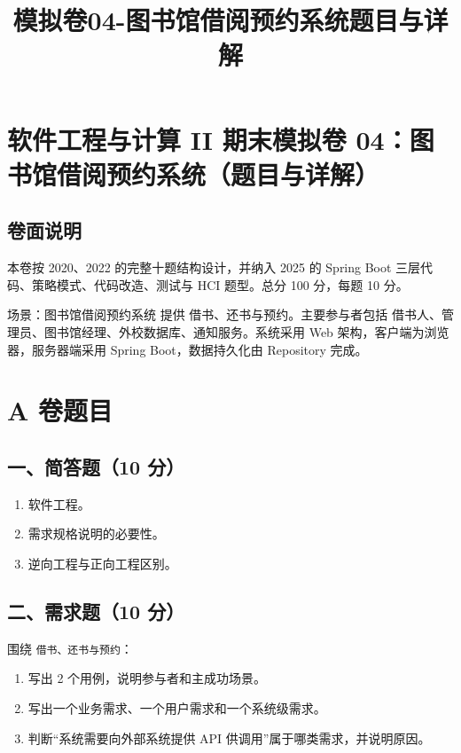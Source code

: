 \documentclass[UTF8,zihao=-4]{ctexart}
\title{模拟卷04-图书馆借阅预约系统题目与详解}
\author{}
\date{}
\begin{document}
\maketitle
\setcounter{tocdepth}{1}
\tableofcontents
\newpage
\section{软件工程与计算 II 期末模拟卷 04：图书馆借阅预约系统（题目与详解）}


\subsection{卷面说明}


本卷按 2020、2022 的完整十题结构设计，并纳入 2025 的 Spring Boot 三层代码、策略模式、代码改造、测试与 HCI 题型。总分 100 分，每题 10 分。


场景：图书馆借阅预约系统 提供 借书、还书与预约。主要参与者包括 借书人、管理员、图书馆经理、外校数据库、通知服务。系统采用 Web 架构，客户端为浏览器，服务器端采用 Spring Boot，数据持久化由 Repository 完成。


\section{A 卷题目}


\subsection{一、简答题（10 分）}


\begin{enumerate}
\item 软件工程。
\item 需求规格说明的必要性。
\item 逆向工程与正向工程区别。
\end{enumerate}


\subsection{二、需求题（10 分）}


围绕 \texttt{借书、还书与预约}：


\begin{enumerate}
\item 写出 2 个用例，说明参与者和主成功场景。
\item 写出一个业务需求、一个用户需求和一个系统级需求。
\item 判断“系统需要向外部系统提供 API 供调用”属于哪类需求，并说明原因。
\end{enumerate}
\end{document}
